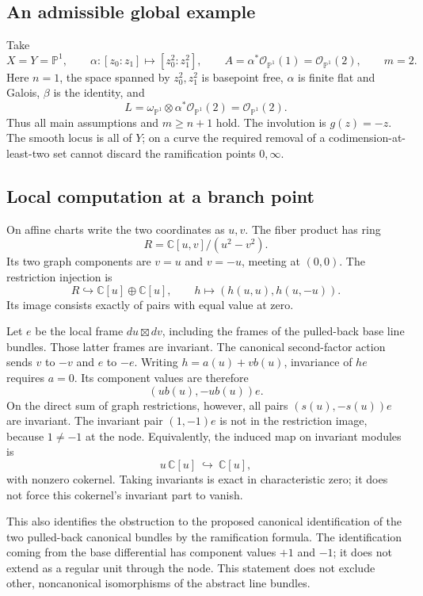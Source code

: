 \documentclass[10pt]{article}
\begin{document}
\subsection*{An admissible global example}
Take \[X=Y=\mathbb P^1,\qquad
 \alpha:[z_0:z_1]\longmapsto[z_0^2:z_1^2],\qquad
 A=\alpha^*\mathcal O_{\mathbb P^1}(1)=\mathcal O_{\mathbb P^1}(2),\qquad m=2.\] Here \(n=1\), the space spanned by \(z_0^2,z_1^2\) is basepoint free, \(\alpha\) is finite flat and Galois, \(\beta\) is the identity, and \[L=\omega_{\mathbb P^1}\otimes\alpha^*\mathcal O_{\mathbb P^1}(2)=\mathcal O_{\mathbb P^1}(2).\] Thus all main assumptions and \(m\ge n+1\) hold. The involution is \(g(z)=-z\). The smooth locus is all of \(Y\); on a curve the required removal of a codimension-at-least-two set cannot discard the ramification points \(0,\infty\).\par
\subsection*{Local computation at a branch point}
On affine charts write the two coordinates as \(u,v\). The fiber product has ring \[R=\mathbb C[u,v]/(u^2-v^2).\] Its two graph components are \(v=u\) and \(v=-u\), meeting at \((0,0)\). The restriction injection is \[R\hookrightarrow \mathbb C[u]\oplus\mathbb C[u],\qquad
 h\longmapsto(h(u,u),h(u,-u)).\] Its image consists exactly of pairs with equal value at zero.\par
Let \(e\) be the local frame \(du\boxtimes dv\), including the frames of the pulled-back base line bundles. Those latter frames are invariant. The canonical second-factor action sends \(v\) to \(-v\) and \(e\) to \(-e\). Writing \(h=a(u)+v b(u)\), invariance of \(he\) requires \(a=0\). Its component values are therefore \[(u b(u),-u b(u))e.\] On the direct sum of graph restrictions, however, all pairs \((s(u),-s(u))e\) are invariant. The invariant pair \((1,-1)e\) is not in the restriction image, because \(1\ne-1\) at the node. Equivalently, the induced map on invariant modules is \[u\,\mathbb C[u]\ \hookrightarrow\ \mathbb C[u],\] with nonzero cokernel. Taking invariants is exact in characteristic zero; it does not force this cokernel’s invariant part to vanish.\par
This also identifies the obstruction to the proposed canonical identification of the two pulled-back canonical bundles by the ramification formula. The identification coming from the base differential has component values \(+1\) and \(-1\); it does not extend as a regular unit through the node. This statement does not exclude other, noncanonical isomorphisms of the abstract line bundles.\par
\end{document}
